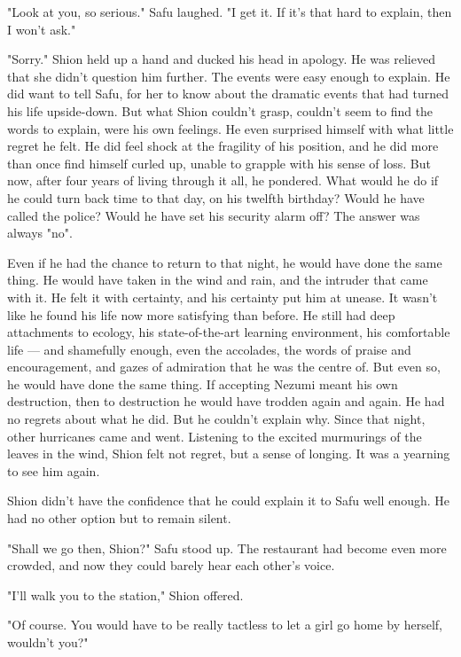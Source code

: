 \mybreak

"Look at you, so serious." Safu laughed. "I get it. If it's that hard to
explain, then I won't ask."

"Sorry." Shion held up a hand and ducked his head in apology. He was
relieved that she didn't question him further. The events were easy
enough to explain. He did want to tell Safu, for her to know about the
dramatic events that had turned his life upside-down. But what Shion
couldn't grasp, couldn't seem to find the words to explain, were his own
feelings. He even surprised himself with what little regret he felt. He
did feel shock at the fragility of his position, and he did more than
once find himself curled up, unable to grapple with his sense of loss.
But now, after four years of living through it all, he pondered. What
would he do if he could turn back time to that day, on his twelfth
birthday? Would he have called the police? Would he have set his
security alarm off? The answer was always "no".

Even if he had the chance to return to that night, he would have done
the same thing. He would have taken in the wind and rain, and the
intruder that came with it. He felt it with certainty, and his certainty
put him at unease. It wasn't like he found his life now more satisfying
than before. He still had deep attachments to ecology, his
state-of-the-art learning environment, his comfortable life --- and
shamefully enough, even the accolades, the words of praise and
encouragement, and gazes of admiration that he was the centre of. But
even so, he would have done the same thing. If accepting Nezumi meant
his own destruction, then to destruction he would have trodden again and
again. He had no regrets about what he did. But he couldn't explain why.
Since that night, other hurricanes came and went. Listening to the
excited murmurings of the leaves in the wind, Shion felt not regret, but
a sense of longing. It was a yearning to see him again.

Shion didn't have the confidence that he could explain it to Safu well
enough. He had no other option but to remain silent.

"Shall we go then, Shion?" Safu stood up. The restaurant had become even
more crowded, and now they could barely hear each other's voice.

"I'll walk you to the station," Shion offered.

"Of course. You would have to be really tactless to let a girl go home
by herself, wouldn't you?"

